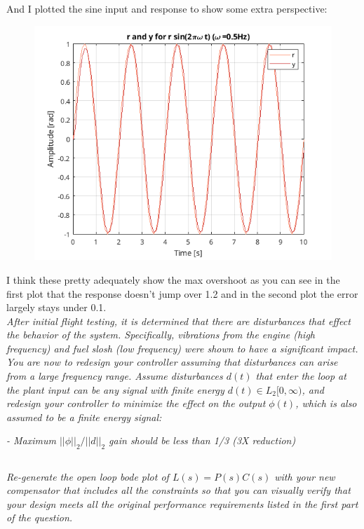 \documentclass{article}
\begin{document}
And I plotted the sine input and response to show some extra perspective:

\begin{figure}[H]
    \centering
    \includegraphics[width=\textwidth]{d4clRY.png}
\end{figure}

I think these pretty adequately show the max overshoot as you can see in the first plot that the response doesn't jump over 1.2 and in the second plot the error largely stays under 0.1. \\

\textit{After initial flight testing, it is determined that there are disturbances that effect the behavior of the system. Specifically, vibrations from the engine (high frequency) and fuel slosh (low frequency) were shown to have a significant impact. You are now to redesign your controller assuming that disturbances can arise from a large frequency range. Assume disturbances $d(t)$ that enter the loop at the plant input can be any signal with finite energy $d(t) \in L_2[0, \infty)$, and redesign your controller to minimize the effect on the output $\phi(t)$, which is also assumed to be a finite energy signal:}
    
\textit{- Maximum $||\phi||_2/||d||_2$ gain should be less than 1/3 (3X reduction)}

\subsection{}
\textit{Re-generate the open loop bode plot of $L(s) = P(s)C(s)$ with your new compensator that includes all the constraints so that you can visually verify that your design meets all the original performance requirements listed in the first part of the question.}
\end{document}
